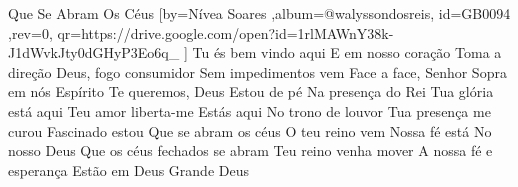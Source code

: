 \beginsong
{Que Se Abram Os Céus %
}[by={Nívea Soares %
},album={@walyssondosreis},
id={GB0094 %
},rev={0}, %
qr={https://drive.google.com/open?id=1rlMAWnY38k-J1dWvkJty0dGHyP3Eo6q_ %
}]
\beginverse*
Tu és bem vindo aqui
E em nosso coração
Toma a direção
\endverse
\beginverse*
Deus, fogo consumidor
Sem impedimentos vem
Face a face, Senhor
\endverse
\beginverse*
Sopra em nós
Espírito
Te queremos, Deus
\endverse
\beginverse*
Estou de pé
Na presença do Rei
Tua glória está aqui
Teu amor liberta-me
\endverse
\beginverse*
Estás aqui
No trono de louvor
Tua presença me curou
Fascinado estou
\endverse
\beginchorus
Que se abram os céus
O teu reino vem
Nossa fé está
No nosso Deus
\endchorus
\beginverse*
Que os céus fechados se abram
Teu reino venha mover
A nossa fé e esperança
Estão em Deus
Grande Deus
\endverse

